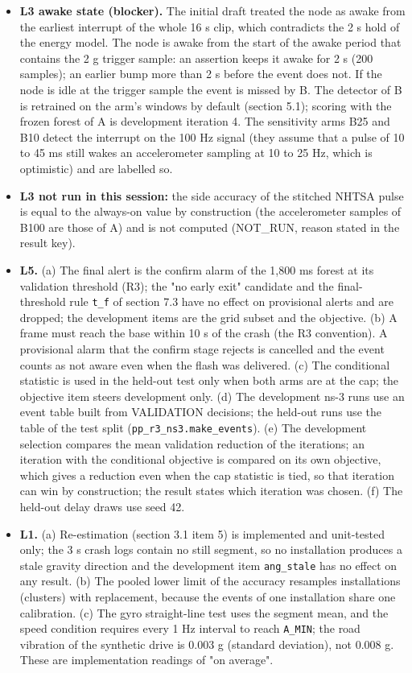 \begin{itemize}
\item \textbf{L3 awake state (blocker).} The initial draft treated the node as awake from the earliest interrupt of the whole 16 s clip, which contradicts the 2 s hold of the energy model. The node is awake from the start of the awake period that contains the 2 g trigger sample: an assertion keeps it awake for 2 s (200 samples); an earlier bump more than 2 s before the event does not. If the node is idle at the trigger sample the event is missed by B. The detector of B is retrained on the arm's windows by default (section 5.1); scoring with the frozen forest of A is development iteration 4. The sensitivity arms B25 and B10 detect the interrupt on the 100 Hz signal (they assume that a pulse of 10 to 45 ms still wakes an accelerometer sampling at 10 to 25 Hz, which is optimistic) and are labelled so.
\item \textbf{L3 not run in this session:} the side accuracy of the stitched NHTSA pulse is equal to the always-on value by construction (the accelerometer samples of B100 are those of A) and is not computed (NOT\_RUN, reason stated in the result key).
\item \textbf{L5.} (a) The final alert is the confirm alarm of the 1,800 ms forest at its validation threshold (R3); the "no early exit" candidate and the final-threshold rule \texttt{t\_f} of section 7.3 have no effect on provisional alerts and are dropped; the development items are the grid subset and the objective. (b) A frame must reach the base within 10 s of the crash (the R3 convention). A provisional alarm that the confirm stage rejects is cancelled and the event counts as not aware even when the flash was delivered. (c) The conditional statistic is used in the held-out test only when both arms are at the cap; the objective item steers development only. (d) The development ns-3 runs use an event table built from VALIDATION decisions; the held-out runs use the table of the test split (\texttt{pp\_r3\_ns3.make\_events}). (e) The development selection compares the mean validation reduction of the iterations; an iteration with the conditional objective is compared on its own objective, which gives a reduction even when the cap statistic is tied, so that iteration can win by construction; the result states which iteration was chosen. (f) The held-out delay draws use seed 42.
\item \textbf{L1.} (a) Re-estimation (section 3.1 item 5) is implemented and unit-tested only; the 3 s crash logs contain no still segment, so no installation produces a stale gravity direction and the development item \texttt{ang\_stale} has no effect on any result. (b) The pooled lower limit of the accuracy resamples installations (clusters) with replacement, because the events of one installation share one calibration. (c) The gyro straight-line test uses the segment mean, and the speed condition requires every 1 Hz interval to reach \texttt{A\_MIN}; the road vibration of the synthetic drive is 0.003 g (standard deviation), not 0.008 g. These are implementation readings of "on average".

\end{itemize}
